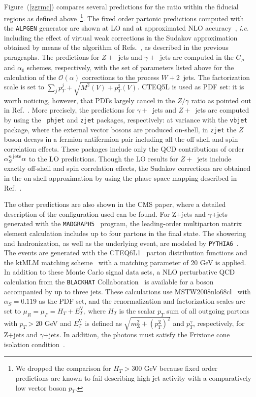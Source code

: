 \documentclass[11pt]{cernrep} \usepackage{graphicx,epsfig} 
\begin{document}
Figure~(\ref{zgrmc}) compares several predictions for the ratio within the fiducial regions as defined above~\footnote{We dropped
the comparison for $H_T>300$ GeV because fixed order predictions are known to fail describing high jet activity with a
comparatively low vector boson $p_T$.}. The fixed
order partonic predictions computed with the {\tt ALPGEN} generator are shown at LO and at 
approximated NLO accuracy~\cite{Chiesa:2013yma}, \emph{i.e.} including the effect of virtual weak corrections in the Sudakov approximation obtained by
means of the algorithm of Refs.~\cite{Denner:2000jv,Denner:2001gw}, as described in the previous paragraphs. The
predictions for $Z+$~jets and $\gamma+$~jets are computed in the $G_{\mu}$ and $\alpha_0$ schemes, respectively, with
the set of parameters listed above for the calculation of the $\mathcal{O}(\alpha)$ corrections to the process
$W+2$~jets. The factorization scale is set to $\sum_j p_T^j +\sqrt{M^2(V) +p^2_T(V)}$. CTEQ5L is used as
PDF set: it is worth noticing, however, that PDFs largely cancel in the $Z/\gamma$ ratio as pointed out in
Ref.~\cite{Ask:2011xf}.  More precisely, the predictions for $\gamma+$~jets and $Z+$~jets are computed by using the {\tt
phjet} and {\tt zjet} packages, respectively: at variance with the {\tt vbjet} package, where the external vector bosons
are produced on-shell, in {\tt zjet} the $Z$ boson decays in a fermion-antifermion pair including all the off-shell and
spin correlation effects. These packages include only the QCD contributions of order $\alpha_S^{n \, {\rm jets}} \alpha$
to the LO predictions. Though the LO results for $Z+$~jets include exactly off-shell and spin correlation effects, the
Sudakov corrections are obtained in the on-shell approximation by using the phase space mapping described in
Ref.~\cite{Denner:2014ina}.

The other predictions are also shown in the CMS paper, where a detailed description of the configuration used can be
found. For Z+jets and $\gamma$+jets generated with the {\tt MADGRAPH5}~\cite{MadGraph5} program, the leading-order
multiparton matrix element calculation includes up to four partons in the final state. The
showering and hadronization, as well as the underlying event, are modeled by {\tt PYTHIA6}~\cite{pythia6}. The events
are generated with the CTEQ6L1~\cite{CTEQ6} parton distribution functions and the ktMLM
matching scheme~\cite{MatchingPaper} with a matching parameter of 20 GeV is applied.  
In addition to these Monte Carlo signal data sets, a NLO perturbative QCD calculation from the
{\tt BLACKHAT} Collaboration~\cite{BlackHat} is available for a boson accompanied by up to three jets. These
calculations use MSTW2008nlo68cl~\cite{MSTW} with $\alpha_{S}=0.119$ as the PDF set, and the renormalization and
factorization scales are set to $\mu_{R}=\mu_{F}=H_T+E_T^{\mathrm{V}}$, where $H_T$ is the scalar $p_T$ sum of all
outgoing partons with $p_T>20$ GeV and $E_T^{\mathrm{V}}$ is defined as
$\sqrt{m_{\mathrm{Z}}^{2}+\left(p_T^{\mathrm{Z}}\right)^{2}}$ and $p_T^{\gamma}$, respectively, for Z+jets and $\gamma$+jets.
In addition, the photons must satisfy the Frixione cone isolation condition~\cite{Frixione}.
\end{document}
